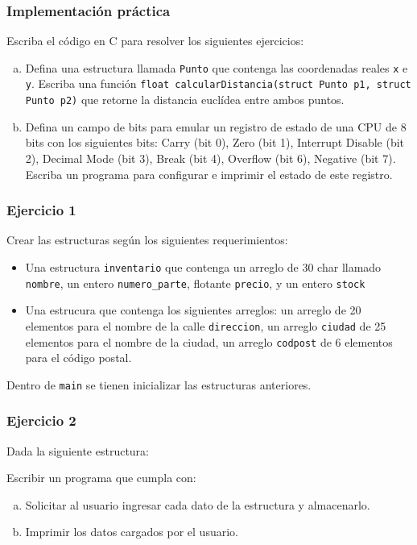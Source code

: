 \begin{ejercicioClase}
    \subsubsection{Implementación práctica}
    Escriba el código en C para resolver los siguientes ejercicios:
    \begin{enumerate}[a)]
        \item Defina una estructura llamada \texttt{Punto} que contenga las coordenadas reales \texttt{x} e \texttt{y}. Escriba una función \texttt{float calcularDistancia(struct Punto p1, struct Punto p2)} que retorne la distancia euclídea entre ambos puntos.
        \item Defina un campo de bits para emular un registro de estado de una CPU de 8 bits con los siguientes bits: Carry (bit 0), Zero (bit 1), Interrupt Disable (bit 2), Decimal Mode (bit 3), Break (bit 4), Overflow (bit 6), Negative (bit 7). Escriba un programa para configurar e imprimir el estado de este registro.
    \end{enumerate}
\end{ejercicioClase}
\subsubsection{Ejercicio 1}
Crear las estructuras según los siguientes requerimientos:
\begin{itemize}
  \item Una estructura \texttt{inventario} que contenga un arreglo de 30 char llamado \texttt{nombre}, un entero \texttt{numero\_parte}, flotante \texttt{precio}, y un entero \texttt{stock}
  \item  Una estrucura que contenga los siguientes arreglos: un arreglo de 20 elementos para el nombre de la calle \texttt{direccion}, un arreglo \texttt{ciudad} de 25 elementos para el nombre de la ciudad, un arreglo \texttt{codpost} de 6 elementos para el código postal.
\end{itemize}
Dentro de \texttt{main} se tienen inicializar las estructuras anteriores.

\subsubsection{Ejercicio 2} 
Dada la siguiente estructura:
\lstset{inputencoding=utf8/latin1}

Escribir un programa que cumpla con:
\begin{enumerate}[a)]
  \item Solicitar al usuario ingresar cada dato de la estructura y almacenarlo.
  \item Imprimir los datos cargados por el usuario.
\end{enumerate}

